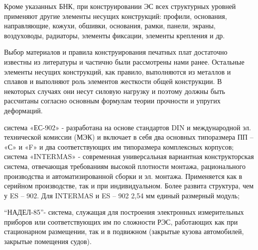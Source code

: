 \documentclass[unicode, 12pt, a4paper, oneside]{article}
\begin{document}
 Кроме указанных БНК, при конструировании ЭС всех структурных уровней применяют другие элементы несущих конструкций: профили, основания, направляющие, кожухи, обшивки, основания, рамки, панели, экраны, воздуховоды, радиаторы, элементы фиксации, элементы крепления и др.
 
Выбор материалов и правила конструирования печатных плат достаточно известны из литературы и частично были рассмотрены нами ранее. Остальные элементы несущих конструкций, как правило, выполняются из металлов и сплавов и выполняют роль элементов жесткости общей конструкции. В некоторых случаях они несут силовую нагрузку и поэтому должны быть рассчитаны согласно основным формулам теории прочности и упругих деформаций.

система «ЕС-902» - разработана на основе стандартов DIN и международной эл. технической комиссии (МЭК) и включает в себя два основных типоразмера ПП – «С» и «F» и два соответствующих им типоразмера комплексных корпусов; система «INTERMAS» - современная универсальная вариантная конструкторская система, отвечающая требованиям высокой плотности монтажа, рационального производства и автоматизированной сборки и эл. монтажа. Применяется как в серийном производстве, так и при индивидуальном. Более развита структура, чем у ES – 902. Для  INTERMAS и ES – 902 2,54 мм единый размерный модуль; 

“НАДЕЛ-85”- система, служащая для построения электронных измерительных приборов или соответствующих им по сложности РЭС, работающих как при стационарном размещении, так и в подвижном (закрытые кузова автомобилей, закрытые помещения судов).
\end{document}
